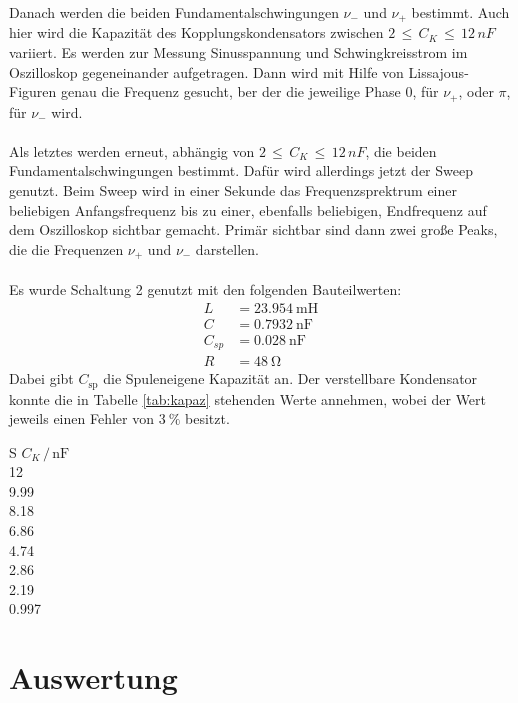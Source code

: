 \documentclass[
  bibliography=totoc,     %
  captions=tableheading,  %
  titlepage=firstiscover, %
]{scrartcl}
\begin{document}
Danach werden die beiden Fundamentalschwingungen $\nu_-$ und $\nu_+$ bestimmt.
Auch hier wird die Kapazität des Kopplungskondensators zwischen
$2\,\leq\,C_K\,\leq\,12\,nF$ variiert. Es werden zur Messung Sinusspannung
und Schwingkreisstrom im Oszilloskop gegeneinander aufgetragen. Dann wird
mit Hilfe von Lissajous-Figuren genau die Frequenz gesucht, ber der die
jeweilige Phase 0, für $\nu_+$, oder $\pi$, für $\nu_-$ wird.\\
\\
Als letztes werden erneut, abhängig von $2\,\leq\,C_K\,\leq\,12\,nF$, die beiden
Fundamentalschwingungen bestimmt. Dafür wird allerdings jetzt der Sweep genutzt.
Beim Sweep wird in einer Sekunde das Frequenzsprektrum einer beliebigen
Anfangsfrequenz bis zu einer, ebenfalls beliebigen, Endfrequenz auf dem
Oszilloskop sichtbar gemacht. Primär sichtbar sind dann zwei große Peaks,
die die Frequenzen $\nu_+$ und $\nu_-$ darstellen.\\
\\
Es wurde Schaltung 2 genutzt mit den folgenden Bauteilwerten:
\begin{align}
  L&=\SI{23.954}{\milli\henry} \\
  C&=\SI{0.7932}{\nano\farad} \\
  C_{sp}&=\SI{0.028}{\nano\farad}\\
  R &= \SI{48}{\ohm}
\end{align}
Dabei gibt $C_\mathup{sp}$ die Spuleneigene Kapazität an.
Der verstellbare Kondensator konnte die in Tabelle \ref{tab:kapaz}
stehenden Werte annehmen, wobei der Wert jeweils einen Fehler von $\SI{3}{\percent}$
besitzt.
\begin{table}
  \centering
  \caption{Mögliche Kapazitäten $C_K$.}
  \label{tab:kapaz}
  \begin{tabular}{S}
    \toprule
    {$C_K \,/\, \si{\nano\farad}$}\\
    \midrule
    \num{12}\\
    \num{9.99}\\
    \num{8.18}\\
    \num{6.86}\\
    \num{4.74}\\
    \num{2.86}\\
    \num{2.19}\\
    \num{0.997}\\
    \bottomrule
  \end{tabular}
\end{table}
\clearpage
\section{Auswertung}
\label{sec:auswertung}
\end{document}

